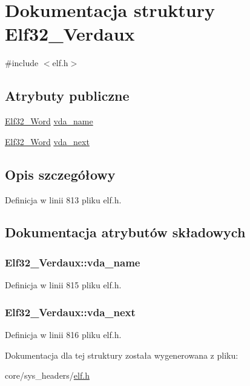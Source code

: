 \hypertarget{struct_elf32___verdaux}{\section{Dokumentacja struktury Elf32\-\_\-\-Verdaux}
\label{struct_elf32___verdaux}
}


{\ttfamily \#include $<$elf.\-h$>$}

\subsection*{Atrybuty publiczne}
\begin{DoxyCompactItemize}
\item 
\hyperlink{elf_8h_af5924ece606c732e86f8263a19408e45}{Elf32\-\_\-\-Word} \hyperlink{struct_elf32___verdaux_a5cec12aee4339964d8956351465efa51}{vda\-\_\-name}
\item 
\hyperlink{elf_8h_af5924ece606c732e86f8263a19408e45}{Elf32\-\_\-\-Word} \hyperlink{struct_elf32___verdaux_ab3814a03060eab7d93f1f79d93d3fedd}{vda\-\_\-next}
\end{DoxyCompactItemize}


\subsection{Opis szczegółowy}


Definicja w linii 813 pliku elf.\-h.



\subsection{Dokumentacja atrybutów składowych}
\hypertarget{struct_elf32___verdaux_a5cec12aee4339964d8956351465efa51}{
\subsubsection[{vda\-\_\-name}]{ Elf32\-\_\-\-Verdaux\-::vda\-\_\-name}}\label{struct_elf32___verdaux_a5cec12aee4339964d8956351465efa51}


Definicja w linii 815 pliku elf.\-h.

\hypertarget{struct_elf32___verdaux_ab3814a03060eab7d93f1f79d93d3fedd}{
\subsubsection[{vda\-\_\-next}]{ Elf32\-\_\-\-Verdaux\-::vda\-\_\-next}}\label{struct_elf32___verdaux_ab3814a03060eab7d93f1f79d93d3fedd}


Definicja w linii 816 pliku elf.\-h.



Dokumentacja dla tej struktury została wygenerowana z pliku\-:\begin{DoxyCompactItemize}
\item 
core/sys\-\_\-headers/\hyperlink{elf_8h}{elf.\-h}\end{DoxyCompactItemize}
